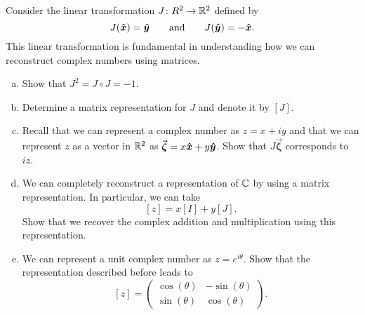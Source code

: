 \documentclass[12pt]{article} %
\begin{document}
\newpage
\begin{problem}
Consider the linear transformation $J \colon R^2 \to \mathbb{R}^2$ defined by 
\[
J(\boldsymbol{\hat{x}}) = \boldsymbol{\hat{y}} \qquad \textrm{and} \qquad J(\boldsymbol{\hat{y}}) = -\boldsymbol{\hat{x}}.
\]
This linear transformation is fundamental in understanding how we can reconstruct complex numbers using matrices.
\begin{enumerate}[(a)]
    \item Show that $J^2 = J\circ J= -1$.
    \item Determine a matrix representation for $J$ and denote it by $[J]$.
    \item Recall that we can represent a complex number as $z=x + iy$ and that we can represent $z$ as a vector in $\mathbb{R}^2$ as $\vec{\boldsymbol{\zeta}} = x\boldsymbol{\hat{x}} + y\boldsymbol{\hat{y}}$.  Show that $J \vec{\boldsymbol{\zeta}}$ corresponds to $iz$.
    \item We can completely reconstruct a representation of $\mathbb{C}$ by using a matrix representation.  In particular, we can take
    \[
        [z] = x [I] + y [J].
    \]
    Show that we recover the complex addition and multiplication using this representation.
    \item We can represent a unit complex number as $z=e^{i\theta}$.  Show that the representation described before leads to
    \[
        [z] = \begin{pmatrix} \cos(\theta) & -\sin(\theta) \\ \sin(\theta) & \cos(\theta) \end{pmatrix}.
    \]
\end{enumerate}
\end{problem}
\end{document}
